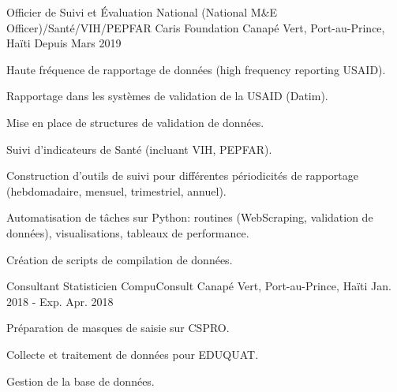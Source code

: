 


\begin{cventries}


\cventry
{Officier de Suivi et \'Evaluation National (National M\&E Officer)/Santé/VIH/PEPFAR } %
{Caris Foundation} %
{Canapé Vert, Port-au-Prince, Ha\"iti} %
{Depuis Mars 2019} %
{ %
\begin{cvitems}
\item {Haute fréquence de rapportage de données (high frequency reporting USAID).}
\item {Rapportage dans les systèmes de validation de la USAID (Datim).}
\item {Mise en place de structures de validation de données.}
\item {Suivi d'indicateurs de Santé (incluant VIH, PEPFAR).}
\item {Construction d'outils de suivi pour différentes périodicités de rapportage (hebdomadaire, mensuel, trimestriel, annuel).}
\item {Automatisation de tâches sur Python: routines (WebScraping, validation de données), visualisations, tableaux de performance.}
\item {Création de scripts de compilation de données.}
\end{cvitems}
}


\cventry
{Consultant Statisticien} %
{CompuConsult} %
{Canapé Vert, Port-au-Prince, Ha\"iti} %
{Jan. 2018 - Exp. Apr. 2018} %
{ %
\begin{cvitems}
\item {Préparation de masques de saisie sur CSPRO.}
\item {Collecte et traitement de données pour EDUQUAT.}
\item {Gestion de la base de données.}
\end{cvitems}
}


\end{cventries}
